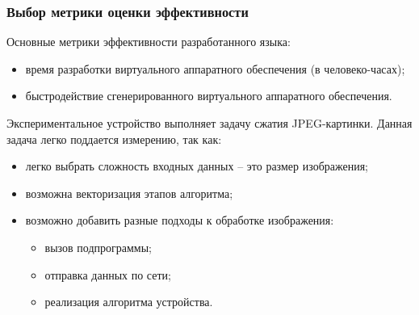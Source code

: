 \begin{frame}%
    \frametitle{Выбор метрики оценки эффективности}
    Основные метрики эффективности разработанного языка:
    \begin{itemize}
        \item время разработки виртуального аппаратного обеспечения (в человеко-часах);
        \item быстродействие сгенерированного виртуального аппаратного обеспечения.
    \end{itemize}


    Экспериментальное устройство выполняет задачу сжатия JPEG-картинки.
    Данная задача легко поддается измерению, так как:
    \begin{itemize}
        \item легко выбрать сложность входных данных -- это
            размер изображения;
        \item возможна векторизация этапов алгоритма;
        \item возможно добавить разные подходы к обработке
            изображения:
            \begin{itemize}
                \item вызов подпрограммы;
                \item отправка данных по сети;
                \item реализация алгоритма устройства.
            \end{itemize}
    \end{itemize}
\end{frame}


